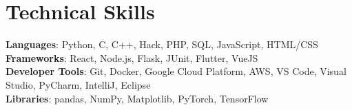 \documentclass[letterpaper,11pt]{article}
\begin{document}
%
\section{Technical Skills}
 \begin{itemize}[leftmargin=0.15in, label={}]
    \small{\item{
     \textbf{Languages}{: Python, C, C++, Hack, PHP, SQL, JavaScript, HTML/CSS} \\
     \textbf{Frameworks}{: React, Node.js, Flask, JUnit, Flutter, VueJS} \\
     \textbf{Developer Tools}{: Git, Docker, Google Cloud Platform, AWS, VS Code, Visual Studio, PyCharm, IntelliJ, Eclipse} \\
     \textbf{Libraries}{: pandas, NumPy, Matplotlib, PyTorch, TensorFlow}
    }}
 \end{itemize}


\end{document}
